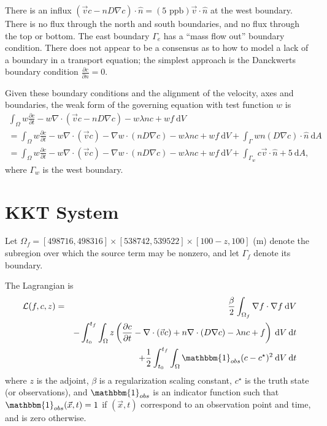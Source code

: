 \documentclass[12pt, letterpaper]{article}
\newcommand{\dA}{{\:\textrm{d}A}}
\newcommand{\dV}{{\:\textrm{d}V}}
\newcommand{\dt}{{\:\textrm{d}t}}
\begin{document}
There is an influx $(\vec{v}c-nD\nabla c)\cdot\hat{n}=(5\textrm{ ppb})\vec{v}\cdot\hat{n}$ at the west boundary. There is no flux through the north and south boundaries, and no flux through the top or bottom. The east boundary $\Gamma_e$ has a ``mass flow out'' boundary condition. There does not appear to be a consensus as to how to model a lack of a boundary in a transport equation; the simplest approach is the Danckwerts boundary condition $\frac{\partial c}{\partial n}=0$. 

Given these boundary conditions and the alignment of the velocity, axes and boundaries, the weak form of the governing equation with test function $w$ is
\begin{multline*}
\int_\Omega w\frac{\partial c}{\partial t} - w\nabla\cdot(\vec{v}c - nD\nabla c) - w\lambda nc + wf \dV \\
= \int_\Omega w\frac{\partial c}{\partial t} - w\nabla\cdot(\vec{v}c) - \nabla w\cdot (nD\nabla c) - w\lambda nc + wf \dV + \int_\Gamma wn(D\nabla c)\cdot\hat{n} \dA\\
= \int_\Omega w\frac{\partial c}{\partial t} - w\nabla\cdot(\vec{v}c) - \nabla w\cdot (nD\nabla c) - w\lambda nc + wf \dV + \int_{\Gamma_w} c\vec{v}\cdot\hat{n}+5 \dA,
\end{multline*}
where $\Gamma_w$ is the west boundary.

\section{KKT System}

Let $\Omega_f=[498716,498316]\times[538742,539522]\times[100-z,100]$ (m) denote the subregion over which the source term may be nonzero, and let $\Gamma_f$ denote its boundary.

The Lagrangian is
\begin{eqnarray*}
\mathcal{L}(f,c,z) &=& \frac{\beta}{2}\int_{\Omega_f}\nabla f\cdot\nabla f\dV \\
&& -\int_{t_0}^{t_f}\int_\Omega z\left(\frac{\partial c}{\partial t}-\nabla\cdot(\vec{v}c)+n\nabla\cdot (D\nabla c)-\lambda n c + f\right)\dV\dt \\
&& +\frac{1}{2}\int_{t_0}^{t_f}\int_\Omega \mathbbm{1}_{obs}(c-c^\star)^2 \dV\dt
\end{eqnarray*}
where $z$ is the adjoint, $\beta$ is a regularization scaling constant, $c^\star$ is the truth state (or observations), and $\mathbbm{1}_{obs}$ is an indicator function such that $\mathbbm{1}_{obs}(\vec{x},t)=1$ if $(\vec{x},t)$ correspond to an observation point and time, and is zero otherwise.
\end{document}
